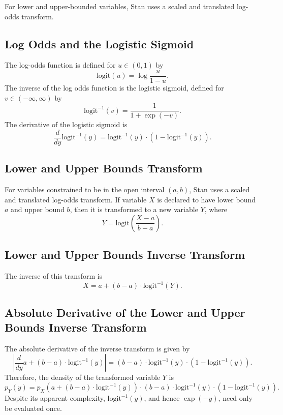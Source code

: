 \documentclass[10pt]{report}
\newcommand{\Stan}{Stan\xspace}
\begin{document}
For lower and upper-bounded variables, \Stan uses a scaled and
translated log-odds transform.

\subsection{Log Odds and the Logistic Sigmoid}

The log-odds function is defined for $u \in (0,1)$ by
%
\[
\mbox{logit}(u) = \log \frac{u}{1 - u}.
\]
% 
The inverse of the log odds function is the logistic sigmoid, defined 
for $v \in (-\infty,\infty)$ by
%
\[
\mbox{logit}^{-1}(v) = \frac{1}{1 + \exp(-v)}.
\]
% 
The derivative of the logistic sigmoid is
%
\[
\frac{d}{dy} \mbox{logit}^{-1}(y) 
= \mbox{logit}^{-1}(y) \cdot \left( 1 - \mbox{logit}^{-1}(y) \right).
\]

\subsection{Lower and Upper Bounds Transform}

For variables constrained to be in the open interval $(a,b)$, \Stan
uses a scaled and translated log-odds transform.  If variable $X$ is
declared to have lower bound $a$ and upper bound $b$, then it is
transformed to a new variable $Y$, where
%
\[
Y = \mbox{logit} \left( \frac{X - a}{b - a} \right).
\]
%

\subsection{Lower and Upper Bounds Inverse Transform}

The inverse of this transform is
%
\[
X = a + (b - a) \cdot \mbox{logit}^{-1}(Y).
\]
%

\subsection{Absolute Derivative of the Lower and Upper Bounds Inverse
  Transform}

The absolute derivative of the inverse transform is given by
\[
\left|  \frac{d}{dy} a + (b - a) \cdot \mbox{logit}^{-1}(y)
    \right|
= (b - a)
    \cdot \mbox{logit}^{-1}(y)
    \cdot \left( 1 - \mbox{logit}^{-1}(y) \right).
\]
Therefore, the density of the transformed variable $Y$ is
%
\[
p_Y(y) 
= 
 p_X \! \left( a + (b - a) \cdot \mbox{logit}^{-1}(y) \right)
    \cdot (b - a)
    \cdot \mbox{logit}^{-1}(y)
    \cdot \left( 1 - \mbox{logit}^{-1}(y) \right).
\]
%
Despite its apparent complexity, $\mbox{logit}^{-1}(y)$, and hence
$\exp(-y)$, need only be evaluated once.
\end{document}
